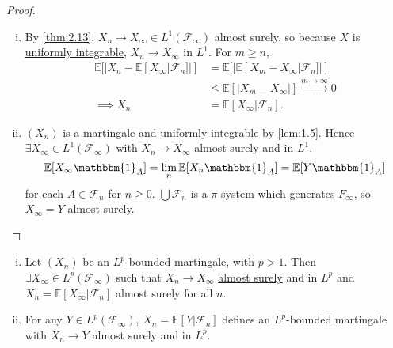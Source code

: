 \documentclass{article}
\newcommand{\F}{\mathcal{F}}
\newcommand{\1}[1]{\mathbbm{1}_{#1}}
\newcommand{\E}{\mathbb{E}}
\begin{document}
\begin{proof}
  \begin{enumerate}[(i)]
    \item By \cref{thm:2.13}, $X_n \to X_\infty \in L^1(\F_\infty)$ almost surely, so because $X$ is \hyperlink{def:ui}{uniformly integrable}, $X_n \to X_\infty$ in $L^1$.
      For $m \geq n$,
      \begin{align*}
        \E[|X_n - \E[X_\infty | \F_n]|] &= \E[|\E[X_m - X_\infty | \F_n] |] \\
                                        &\leq \E[|X_m - X_\infty|] \xrightarrow {m \to \infty} 0 \\
        \implies X_n &= \E[X_\infty | \F_n]
      .\end{align*}
    \item $(X_n)$ is a martingale and \hyperlink{def:ui}{uniformly integrable} by \cref{lem:1.5}.
      Hence $\exists X_\infty \in L^1(\F_\infty)$ with $X_n \to X_\infty$ almost surely and in $L^1$.
      \begin{equation*}
        \E[X_\infty \1A] = \lim_n \E[X_n \1A] = \E[Y \1A]
      \end{equation*}
      for each $A \in \F_n$ for $n \geq 0$.
      $\bigcup \F_n$ is a $\pi$-system which generates $F_\infty$, so $X_\infty = Y$ almost surely. \qedhere
  \end{enumerate}
\end{proof}
\begin{nthm}\label{thm:2.15}\leavevmode
  \begin{enumerate}[(i)]
    \item Let $(X_n)$ be an \hyperlink{def:lpbounded}{$L^p$-bounded} \hyperlink{def:martingale}{martingale}, with $p > 1$.
      Then $\exists X_\infty \in L^p(\F_\infty)$ such that
      $X_n \to X_\infty$ \hyperlink{def:as}{almost surely} and in $L^p$ and $X_n = \E[X_\infty | \F_n]$ almost surely for all $n$.
    \item For any $Y \in L^p(\F_\infty)$, $X_n = \E[Y | \F_n]$ defines an $L^p$-bounded martingale with $X_n \to Y$ almost surely and in $L^p$.
  \end{enumerate}
\end{nthm}
\end{document}
